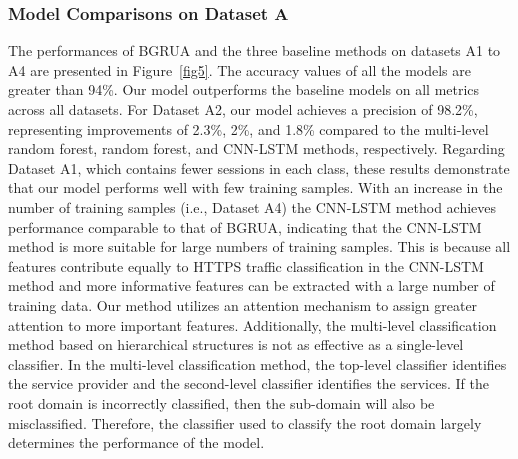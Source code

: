 \documentclass[preprint,12pt]{elsarticle}
\begin{document}
\subsubsection{Model Comparisons on Dataset A}
The performances of BGRUA and the three baseline methods on datasets A1 to A4 are presented in Figure~\ref{fig5}. The accuracy values of all the models are greater than 94\%. Our model outperforms the baseline models on all metrics across all datasets. For Dataset A2, our model achieves a precision of 98.2\%, representing improvements of 2.3\%, 2\%, and 1.8\% compared to the multi-level random forest, random forest, and CNN-LSTM methods, respectively. Regarding Dataset A1, which contains fewer sessions in each class, these results demonstrate that our model performs well with few training samples. With an increase in the number of training samples (i.e., Dataset A4) the CNN-LSTM method achieves performance comparable to that of BGRUA, indicating that the CNN-LSTM method is more suitable for large numbers of training samples. This is because all features contribute equally to HTTPS traffic classification in the CNN-LSTM method and more informative features can be extracted with a large number of training data. Our method utilizes an attention mechanism to assign greater attention to more important features. Additionally, the multi-level classification method based on hierarchical structures is not as effective as a single-level classifier. In the multi-level classification method, the top-level classifier identifies the service provider and the second-level classifier identifies the services. If the root domain is incorrectly classified, then the sub-domain will also be misclassified. Therefore, the classifier used to classify the root domain largely determines the performance of the model.

% 
\end{document}
